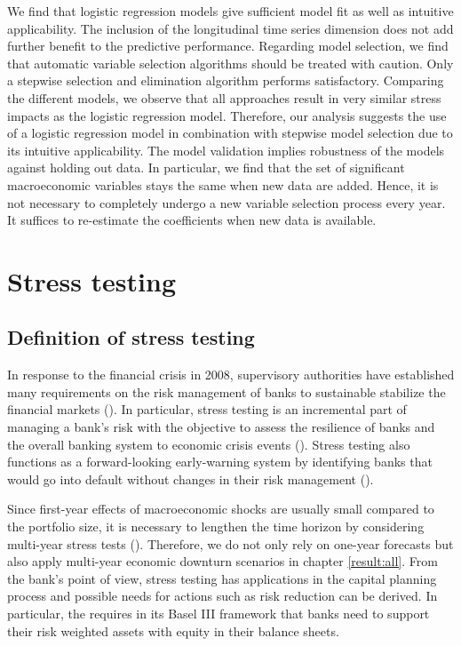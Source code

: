 \documentclass[a4paper, 12pt]{scrreprt}
\begin{document}
\bigskip

We find that logistic regression models give sufficient model fit as well as intuitive applicability. The inclusion of the longitudinal time series dimension does not add further benefit to the predictive performance. Regarding model selection, we find that automatic variable selection algorithms should be treated with caution. Only a stepwise selection and elimination algorithm performs satisfactory. Comparing the different models, we observe that all approaches result in very similar stress impacts as the logistic regression model.
Therefore, our analysis suggests the use of a logistic regression model in combination with stepwise model selection due to its intuitive applicability.
The model validation implies robustness of the models against holding out data. In particular, we find that the set of significant macroeconomic variables stays the same when new data are added.
Hence, it is not necessary to completely undergo a new variable selection process every year. It suffices to re-estimate the coefficients when new data is available. 



\chapter{Stress testing}\label{par:stresstesting}

\section{Definition of stress testing}\label{par:definitionstress}


In response to the financial crisis in 2008, supervisory authorities have established many requirements on the risk management of banks to sustainable stabilize the financial markets (\textcite[chapter 2.5]{bis2004sorge}). In particular, stress testing is an incremental part of managing a bank's risk with the objective to assess the resilience of banks and the overall banking system to economic crisis events (\textcite[note 2]{eba2018stresstest}). 
Stress testing also functions as a forward-looking early-warning system by identifying banks that would go into default without changes in their risk management (\textcite{bcbs2012macroprudential}).

Since first-year effects of macroeconomic shocks are usually small compared to the portfolio size, it is necessary to lengthen the time horizon by considering multi-year stress tests (\textcite[chapter 4.1.2]{bis2004sorge}). Therefore, we do not only rely on one-year forecasts but also apply multi-year economic downturn scenarios in chapter \ref{result:all}.
From the bank's point of view, stress testing has applications in the capital planning process and possible needs for actions such as risk reduction can be derived.
In particular, the \textcite{bcbs2010baselIII} requires in its Basel III framework that banks need to support their risk weighted assets with equity in their balance sheets.
\end{document}

